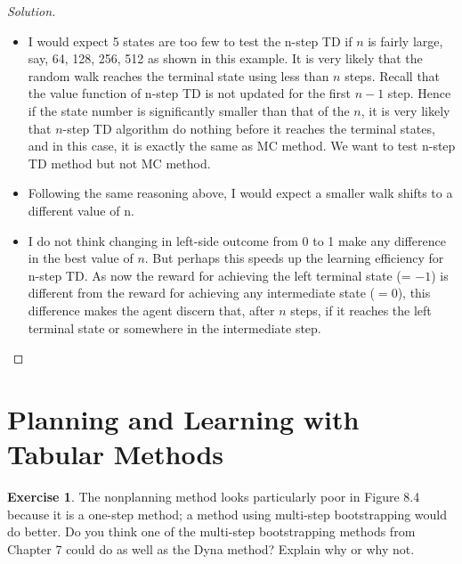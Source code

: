 \documentclass[oneside,11pt]{article}
\theoremstyle{definition}
\newtheorem{exer}[thm]{Exercise}
\newenvironment{solution}
{\renewcommand\qedsymbol{$\blacksquare$}\begin{proof}[Solution]} {\end{proof}}
\begin{document}
\begin{shaded}
\begin{solution}
~\\
\begin{itemize} 
 \item I would expect 5 states are too few to test the n-step TD if $n$ is fairly large, say, 64, 128, 256, 512 as shown in this example. It is very likely that the random walk reaches the terminal state using less than $n$ steps. Recall that the value function of n-step TD is not updated for the first $n-1$ step. Hence if the state number is significantly smaller than that of the $n$, it is very likely that $n$-step TD algorithm do nothing before it reaches the terminal states, and in this case, it is exactly the same as MC method. We want to test n-step TD method but not MC method.
 
 \item Following the same reasoning above, I would expect a smaller walk shifts to a different value of n. 

 \item I do not think changing in left-side outcome from 0 to 1 make any difference in the best value of $n$. But perhaps this speeds up the learning efficiency for n-step TD. As now the reward for achieving the left terminal state (= $-1$) is different from the reward for achieving any intermediate state ($= 0$), this difference makes the agent discern that, after $n$ steps, if it reaches the left terminal state or somewhere in the intermediate step.
 
 \end{itemize}

\end{solution} 
\end{shaded}

\section{Planning and Learning with Tabular Methods}


\begin{exer}
The nonplanning method looks particularly poor in Figure 8.4 because it is a one-step method; a method using multi-step bootstrapping would do better. Do you think one of the multi-step bootstrapping methods from Chapter 7 could do as well as the Dyna method? Explain why or why not.
\end{exer}
\end{document}
